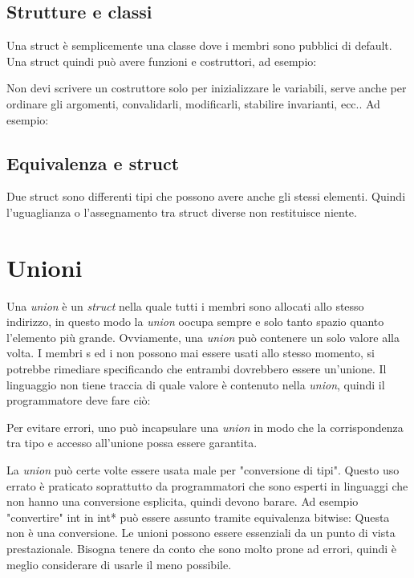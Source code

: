\documentclass[11pt,a4paper]{book}
\begin{document}
\subsection{Strutture e classi}
Una struct è semplicemente una classe dove i membri sono pubblici di default. Una struct quindi può avere funzioni e costruttori, ad esempio:
\label{code: 110}

Non devi scrivere un costruttore solo per inizializzare le variabili, serve anche per ordinare gli argomenti, convalidarli, modificarli, stabilire invarianti, ecc.. Ad esempio:
\label{code: 111}

\subsection{Equivalenza e struct}
Due struct sono differenti tipi che possono avere anche gli stessi elementi. Quindi l'uguaglianza o l'assegnamento tra struct diverse non restituisce niente.

\section{Unioni}
Una \emph{union} è un \emph{struct} nella quale tutti i membri sono allocati allo stesso indirizzo, in questo modo la \emph{union} oocupa sempre e solo tanto spazio quanto l'elemento più grande. Ovviamente, una \emph{union} può contenere un solo valore alla volta.
\label{code: 112}
I membri s ed i non possono mai essere usati allo stesso momento, si potrebbe rimediare specificando che entrambi dovrebbero essere un'unione.
\label{code: 113}
Il linguaggio non tiene traccia di quale valore è contenuto nella \emph{union}, quindi il programmatore deve fare ciò:
\label{code: 114}

Per evitare errori, uno può incapsulare una \emph{union} in modo che la corrispondenza tra tipo e accesso all'unione possa essere garantita.

La \emph{union} può certe volte essere usata male per "conversione di tipi". Questo uso errato è praticato soprattutto da programmatori che sono esperti in linguaggi che non hanno una conversione esplicita, quindi devono barare. Ad esempio "convertire" int in int* può essere assunto tramite equivalenza bitwise:
\label{code: 115}
Questa non è una conversione.
Le unioni possono essere essenziali da un punto di vista prestazionale. Bisogna tenere da conto che sono molto prone ad errori, quindi è meglio considerare di usarle il meno possibile.
\end{document}
